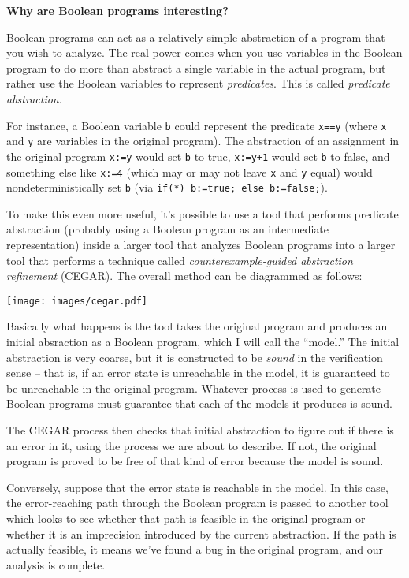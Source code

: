 \documentclass{article}
\newcommand{\Code}[1]{\texttt{#1}}
\newenvironment{sidebar}{}{}
\newcommand{\strong}[1]{\textbf{#1}}
\begin{document}
\begin{sidebar}
\strong{Why are Boolean programs interesting?}

Boolean programs can act as a relatively simple abstraction of a
program that you wish to analyze. The real power comes when you use
variables in the Boolean program to do more than abstract a single
variable in the actual program, but rather use the Boolean variables
to represent \emph{predicates}. This is called \emph{predicate
  abstraction}.

For instance, a Boolean variable \Code{b} could represent the
predicate \Code{x==y} (where \Code{x} and \Code{y} are variables in
the original program). The abstraction of an assignment in the
original program \Code{x:=y} would set \Code{b} to true, \Code{x:=y+1}
would set \Code{b} to false, and something else like \Code{x:=4}
(which may or may not leave \Code{x} and \Code{y} equal) would
nondeterministically set \Code{b} (via \Code{if(*) b:=true; else
  b:=false;}). 

To make this even more useful, it's possible to use a tool that
performs predicate abstraction (probably using a Boolean program as an
intermediate representation) inside a larger tool that analyzes
Boolean programs into a larger tool that performs a technique called
\emph{counterexample-guided abstraction refinement} (CEGAR). The
overall method can be diagrammed as follows:
\begin{center}
  \texttt{[image: images/cegar.pdf]}
\end{center}

Basically what happens is the tool takes the original program and
produces an initial absraction as a Boolean program, which I will call
the ``model.'' The initial abstraction is very coarse, but it is
constructed to be \emph{sound} in the verification sense -- that is,
if an error state is unreachable in the model, it is guaranteed to be
unreachable in the original program. Whatever process is used to
generate Boolean programs must guarantee that each of the models it
produces is sound.

The CEGAR process then checks that initial abstraction to figure out
if there is an error in it, using the process we are about to
describe. If not, the original program is proved to be free of that
kind of error because the model is sound.

Conversely, suppose that the error state is reachable in the model. In
this case, the error-reaching path through the Boolean program is
passed to another tool which looks to see whether that path is
feasible in the original program or whether it is an imprecision
introduced by the current abstraction. If the path is actually
feasible, it means we've found a bug in the original program, and our
analysis is complete.


\end{sidebar}
\end{document}
